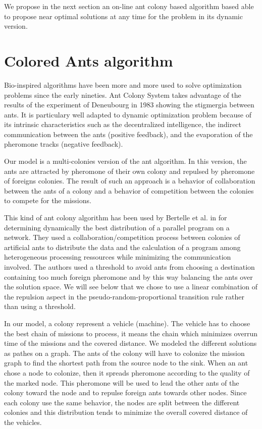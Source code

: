 \documentclass[a4paper,10pt]{article}
\begin{document}
We propose in the next section an on-line ant colony based algorithm based able to propose near optimal solutions at any time for the problem in its dynamic version.

\section{Colored Ants algorithm}
Bio-inspired algorithms have been more and more used to solve optimization problems since the early nineties\cite{Dorigo2006}. Ant Colony System takes advantage of the results of the experiment of Deneubourg in 1983 \cite{Deneubourg1983} showing the stigmergia between ants. It is particulary well adapted to dynamic optimization problem because of its intrinsic characteristics such as the decentralized intelligence, the indirect communication between the ants (positive feedback), and the evaporation of the pheromone tracks (negative feedback).

Our model is a multi-colonies version of the ant algorithm. In this version, the ants are attracted by pheromone of their own colony and repulsed by pheromone of foreigns colonies. The result of such an approach is a behavior of collaboration between the ants of a colony and a behavior of competition between the colonies to compete for the missions.

This kind of ant colony algorithm has been used by Bertelle et al. in \cite{Bertelle2006,Bertelle2007} for determining dynamically the best distribution of a parallel program on a network. They used a collaboration/competition process between colonies of artificial ants to distribute the data and the calculation of a program among heterogeneous processing ressources while minimizing the communication involved. The authors used a threshold to avoid ants from choosing a destination containing too much foreign pheromone and by this way balancing the ants over the solution space. We will see below that we chose to use a linear combination of the repulsion aspect in the pseudo-random-proportional transition rule rather than using a threshold.

In our model, a colony represent a vehicle (machine). The vehicle has to choose the best chain of missions to process, it means the chain which minimizes overrun time of the missions and the covered distance. We modeled the different solutions as pathes on a graph. The ants of the colony will have to colonize the mission graph to find the shortest path from the source node to the sink. When an ant chose a node to colonize, then it spreads pheromone according to the quality of the marked node. This pheromone will be used to lead the other ants of the colony toward the node and to repulse foreign ants towards other nodes.
Since each colony use the same behavior, the nodes are split between the different colonies and this distribution tends to minimize the overall covered distance of the vehicles.
\end{document}
